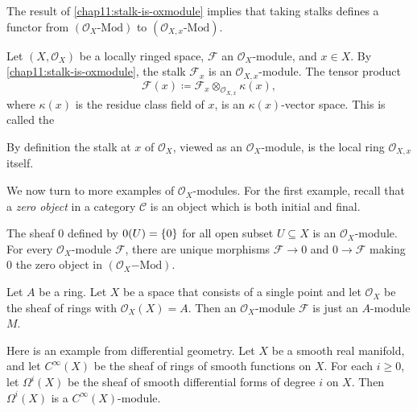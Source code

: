 The result of \cref{chap11:stalk-is-oxmodule} implies that taking stalks defines a functor from $(\mathcal{O}_X\text{-Mod})$ to $(\mathcal{O}_{X, x}\text{-Mod})$.

\begin{definition}
	Let $(X, \mathcal{O}_X)$ be a locally ringed space, $\mathcal{F}$ an $\mathcal{O}_X$-module, and $x \in X$. By \cref{chap11:stalk-is-oxmodule}, the stalk $\mathcal{F}_x$ is an $\mathcal{O}_{X, x}$-module.  The tensor product
	\begin{equation*}
		\mathcal{F}(x) \coloneqq \mathcal{F}_x \otimes_{\mathcal{O}_{X, x}} \kappa(x),
	\end{equation*}
	where $\kappa(x)$ is the residue class field of $x$, is an $\kappa(x)$-vector space. This is called the 
\end{definition}

By definition the stalk at $x$ of $\mathcal{O}_X$, viewed as an $\mathcal{O}_X$-module, is the local ring $\mathcal{O}_{X, x}$ itself.

We now turn to more examples of $\mathcal{O}_X$-modules. For the first example, recall that a \textit{zero object} in a category $\mathcal{C}$ is an object which is both initial and final.

\begin{example}
	The sheaf $0$ defined by $0(U) = \lbrace0\rbrace$ for all open subset $U \subseteq X$ is an $\mathcal{O}_X$-module. For every $\mathcal{O}_X$-module $\mathcal{F}$, there are unique morphisms $\mathcal{F} \to 0$ and $0 \to \mathcal{F}$ making $0$ the zero object in $(\mathcal{O}_X\mathrm{-Mod})$.
\end{example}

\begin{example}
	Let $A$ be a ring. Let $X$ be a space that consists of a single point and let $\mathscr{O}_X$ be the sheaf of rings with $\mathscr{O}_X(X) = A$. Then an $\mathscr{O}_X$-module $\mathcal{F}$ is just an $A$-module $M$.
\end{example}

\begin{example}
	Here is an example from differential geometry. Let $X$ be a smooth real manifold, and let $C^\infty(X)$ be the sheaf of rings of smooth functions on $X$. For each $i \geq 0$, let $\Omega^i(X)$ be the sheaf of smooth differential forms of degree $i$ on $X$. Then $\Omega^i(X)$ is a $C^\infty(X)$-module.
\end{example}	

